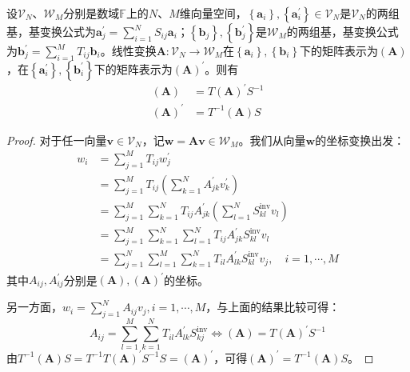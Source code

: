\documentclass[main.tex]{subfiles}
\begin{document}
\begin{theorem}\label{thm:II.5.2}
设$\mathcal{V}_N$、$\mathcal{W}_M$分别是数域$\mathbb{F}$上的$N$、$M$维向量空间，$\left\{\mathbf{a}_i\right\},\left\{\mathbf{a}^\prime_i\right\}\in\mathcal{V}_N$是$\mathcal{V}_N$的两组基，基变换公式为$\mathbf{a}^\prime_j=\sum_{i=1}^NS_{ij}\mathbf{a}_i$；$\left\{\mathbf{b}_j\right\},\left\{\mathbf{b}^\prime_j\right\}$是$\mathcal{W}_M$的两组基，基变换公式为$\mathbf{b}^\prime_j=\sum_{i=1}^MT_{ij}\mathbf{b}_i$。线性变换$\mathbf{A}:\mathcal{V}_N\rightarrow\mathcal{W}_M$在$\left\{\mathbf{a}_i\right\},\left\{\mathbf{b}_i\right\}$下的矩阵表示为$\left(\mathbf{A}\right)$，在$\left\{\mathbf{a}^\prime_i\right\},\left\{\mathbf{b}^\prime_i\right\}$下的矩阵表示为$\left(\mathbf{A}\right)^\prime$。则有
\begin{align*}
    \left(\mathbf{A}\right)&=T\left(\mathbf{A}\right)^\prime S^{-1}\\
    \left(\mathbf{A}\right)^\prime&=T^{-1}\left(\mathbf{A}\right)S
\end{align*}
\end{theorem}
\begin{proof}
对于任一向量$\mathbf{v}\in\mathcal{V}_N$，记$\mathbf{w}=\mathbf{Av}\in\mathcal{W}_M$。我们从向量$\mathbf{w}$的坐标变换出发：
\begin{align*}
    w_i&=\sum_{j=1}^MT_{ij}w^\prime_j\\
    &=\sum_{j=1}^MT_{ij}\left(\sum_{k=1}^NA^\prime_{jk}v^\prime_k\right)\\
    &=\sum_{j=1}^M\sum_{k=1}^NT_{ij}A^\prime_{jk}\left(\sum_{l=1}^NS^\mathrm{inv}_{kl}v_l\right)\\
    &=\sum_{j=1}^M\sum_{k=1}^N\sum_{l=1}^NT_{ij}A^\prime_{jk}S^\mathrm{inv}_{kl}v_l\\
    &=\sum_{j=1}^N\sum_{l=1}^M\sum_{k=1}^NT_{il}A^\prime_{lk}S^\mathrm{inv}_{kl}v_j,\quad i=1,\cdots,M
\end{align*}
其中$A_{ij},A^\prime_{ij}$分别是$\left(\mathbf{A}\right),\left(\mathbf{A}\right)^\prime$的坐标。

另一方面，$w_i=\sum_{j=1}^NA_{ij}v_j,i=1,\cdots,M$，与上面的结果比较可得：
\[
A_{ij}=\sum_{l=1}^M\sum_{k=1}^NT_{il}A^\prime_{lk}S^\mathrm{inv}_{kj}
\Leftrightarrow \left(\mathbf{A}\right)=T\left(\mathbf{A}\right)^\prime S^{-1}
\]
由$T^{-1}\left(\mathbf{A}\right)S=T^{-1}T\left(\mathbf{A}\right)^\prime S^{-1}S=\left(\mathbf{A}\right)^\prime$，可得$\left(\mathbf{A}\right)^\prime=T^{-1}\left(\mathbf{A}\right)S$。
\end{proof}
\end{document}
